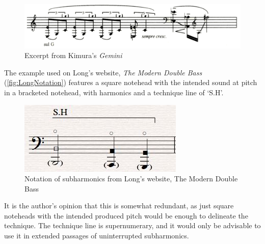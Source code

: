   
\begin{figure}
  \includegraphics[width=\linewidth]{./resources/kimura_gemini.png}
  \caption{Excerpt from Kimura's \emph{Gemini}}\label{fig:Excerpt from Kimura's Gemini}
\end{figure}

The example used on Long's website, \emph{The Modern Double Bass} (\autoref{fig:LongNotation}) features a square notehead with the intended sound at pitch in a bracketed notehead, with harmonics and a technique line of `S.H'.\autocite[]{longSubharmonics2019}

\begin{figure}
  \includegraphics[width=\linewidth]{./resources/longSubharmonicNotation.jpg}
  \caption{Notation of subharmonics from Long's website, The Modern Double Bass}\label{fig:LongNotation}
\end{figure}

It is the author's opinion that this is somewhat redundant, as just square noteheads with the intended produced pitch would be enough to delineate the technique. 
The technique line is supernumerary, and it would only be advisable to use it in extended passages of uninterrupted subharmonics.


